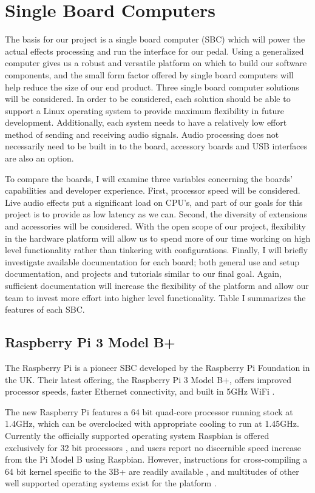 \documentclass[journal,onecolumn,draftclsnofoot]{IEEEtran}
\begin{document}
\section{Single Board Computers}
The basis for our project is a single board computer (SBC) which will power the actual effects processing and run the interface for our pedal. Using a generalized computer gives us a robust and versatile platform on which to build our software components, and the small form factor offered by single board computers will help reduce the size of our end product. Three single board computer solutions will be considered.
In order to be considered, each solution should be able to support a Linux operating system to provide maximum flexibility in future development. Additionally, each system needs to have a relatively low effort method of sending and receiving audio signals. Audio processing does not necessarily need to be built in to the board, accessory boards and USB interfaces are also an option.


To compare the boards, I will examine three variables concerning the boards' capabilities and developer experience. First, processor speed will be considered. Live audio effects put a significant load on CPU's, and part of our goals for this project is to provide as low latency as we can. Second, the diversity of extensions and accessories will be considered. With the open scope of our project, flexibility in the hardware platform will allow us to spend more of our time working on high level functionality rather than tinkering with configurations. Finally, I will briefly investigate available documentation for each board; both general use and setup documentation, and projects and tutorials similar to our final goal. Again, sufficient documentation will increase the flexibility of the platform and allow our team to invest more effort into higher level functionality. Table I summarizes the features of each SBC.


\subsection{Raspberry Pi 3 Model B+} %
The Raspberry Pi is a pioneer SBC developed by the Raspberry Pi Foundation in the UK. Their latest offering, the Raspberry Pi 3 Model B+, offers improved processor speeds, faster Ethernet connectivity, and built in 5GHz WiFi \cite{raspberrypi}. 

The new Raspberry Pi features a 64 bit quad-core processor running stock at 1.4GHz, which can be overclocked with appropriate cooling to run at 1.45GHz. Currently the officially supported operating system Raspbian is offered exclusively for 32 bit processors \cite{rpi:32bitonly}, and users report no discernible speed increase from the Pi Model B using Raspbian\cite{rpi:procspeed}. However, instructions for cross-compiling a 64 bit kernel specific to the 3B+ are readily available \cite{rpi:64bitkernel}, and multitudes of other well supported operating systems exist for the platform \cite{rpi:altos}.
\end{document}
